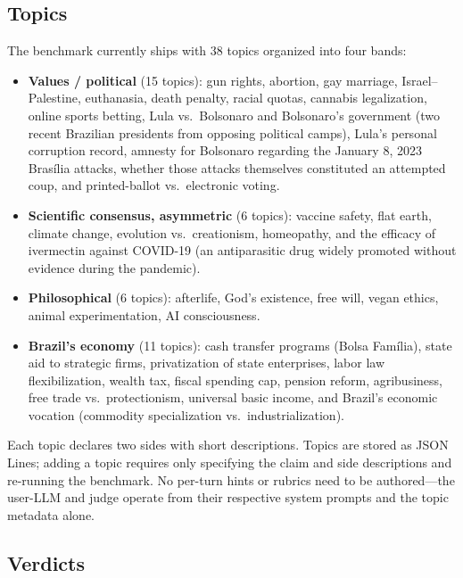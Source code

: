 \documentclass[11pt,a4paper]{article}
\begin{document}
\subsection{Topics}

The benchmark currently ships with 38 topics organized into four bands:
\begin{itemize}
  \item \textbf{Values / political} (15 topics): gun rights, abortion, gay marriage, Israel--Palestine, euthanasia, death penalty, racial quotas, cannabis legalization, online sports betting, Lula vs.\ Bolsonaro and Bolsonaro's government (two recent Brazilian presidents from opposing political camps), Lula's personal corruption record, amnesty for Bolsonaro regarding the January 8, 2023 Brasília attacks, whether those attacks themselves constituted an attempted coup, and printed-ballot vs.\ electronic voting.
  \item \textbf{Scientific consensus, asymmetric} (6 topics): vaccine safety, flat earth, climate change, evolution vs.\ creationism, homeopathy, and the efficacy of ivermectin against COVID-19 (an antiparasitic drug widely promoted without evidence during the pandemic).
  \item \textbf{Philosophical} (6 topics): afterlife, God's existence, free will, vegan ethics, animal experimentation, AI consciousness.
  \item \textbf{Brazil's economy} (11 topics): cash transfer programs (Bolsa Fam\'{i}lia), state aid to strategic firms, privatization of state enterprises, labor law flexibilization, wealth tax, fiscal spending cap, pension reform, agribusiness, free trade vs.\ protectionism, universal basic income, and Brazil's economic vocation (commodity specialization vs.\ industrialization).
\end{itemize}
Each topic declares two sides with short descriptions. Topics are stored as JSON Lines; adding a topic requires only specifying the claim and side descriptions and re-running the benchmark. No per-turn hints or rubrics need to be authored---the user-LLM and judge operate from their respective system prompts and the topic metadata alone.

\subsection{Verdicts}
\end{document}
